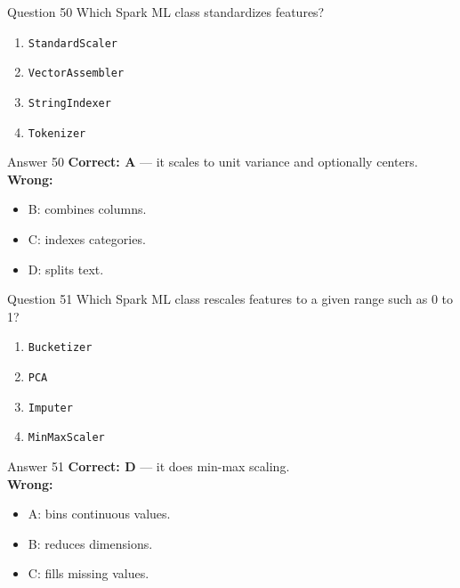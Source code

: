 \documentclass[aspectratio=169,11pt]{beamer}
\begin{document}
\begin{frame}{Question 50}
Which Spark ML class standardizes features?
\begin{enumerate}[label=\Alph*.]
\item \texttt{StandardScaler}
\item \texttt{VectorAssembler}
\item \texttt{StringIndexer}
\item \texttt{Tokenizer}
\end{enumerate}
\end{frame}
\begin{frame}{Answer 50}
\textbf{Correct: A} --- it scales to unit variance and optionally centers.\\
\vspace{0.5em}
\textbf{Wrong:}
\begin{itemize}
\item B: combines columns.
\item C: indexes categories.
\item D: splits text.
\end{itemize}
\end{frame}

\begin{frame}{Question 51}
Which Spark ML class rescales features to a given range such as 0 to 1?
\begin{enumerate}[label=\Alph*.]
\item \texttt{Bucketizer}
\item \texttt{PCA}
\item \texttt{Imputer}
\item \texttt{MinMaxScaler}
\end{enumerate}
\end{frame}
\begin{frame}{Answer 51}
\textbf{Correct: D} --- it does min-max scaling.\\
\vspace{0.5em}
\textbf{Wrong:}
\begin{itemize}
\item A: bins continuous values.
\item B: reduces dimensions.
\item C: fills missing values.
\end{itemize}
\end{frame}
\end{document}
